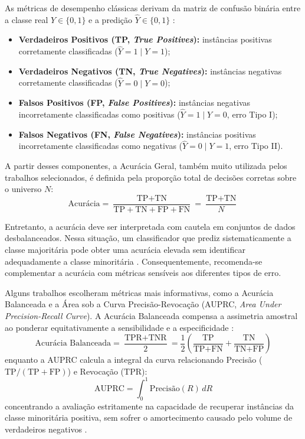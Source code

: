As métricas de desempenho clássicas derivam da matriz de confusão binária entre a classe real $Y \in \{0, 1\}$ e a predição $\hat{Y} \in \{0, 1\}$ \cite{sokolova2009systematic}:
\begin{itemize}
    \item \textbf{Verdadeiros Positivos (TP, \emph{True Positives}):} instâncias positivas corretamente classificadas ($\hat{Y} = 1 \mid Y = 1$);
    \item \textbf{Verdadeiros Negativos (TN, \emph{True Negatives}):} instâncias negativas corretamente classificadas ($\hat{Y} = 0 \mid Y = 0$);
    \item \textbf{Falsos Positivos (FP, \emph{False Positives}):} instâncias negativas incorretamente classificadas como positivas ($\hat{Y} = 1 \mid Y = 0$, erro Tipo I);
    \item \textbf{Falsos Negativos (FN, \emph{False Negatives}):} instâncias positivas incorretamente classificadas como negativas ($\hat{Y} = 0 \mid Y = 1$, erro Tipo II).
\end{itemize}
A partir desses componentes, a Acurácia Geral, também muito utilizada pelos trabalhos selecionados, é definida pela proporção total de decisões corretas sobre o universo $N$:
\begin{equation}
\text{Acurácia} = \frac{\text{TP} + \text{TN}}{\text{TP} + \text{TN} + \text{FP} + \text{FN}} = \frac{\text{TP} + \text{TN}}{N}
\end{equation}

Entretanto, a acurácia deve ser interpretada com cautela em conjuntos de dados desbalanceados. Nessa situação, um classificador que prediz sistematicamente a classe majoritária pode obter uma acurácia elevada sem identificar adequadamente a classe minoritária \cite{he2009learning}. Consequentemente, recomenda-se complementar a acurácia com métricas sensíveis aos diferentes tipos de erro.

Alguns trabalhos escolheram métricas mais informativas, como a Acurácia Balanceada e a Área sob a Curva Precisão-Revocação (AUPRC, \emph{Area Under Precision-Recall Curve}). A Acurácia Balanceada compensa a assimetria amostral ao ponderar equitativamente a sensibilidade e a especificidade \cite{brodersen2010balanced}:
\begin{equation}
\text{Acurácia Balanceada} = \frac{\text{TPR} + \text{TNR}}{2} = \frac{1}{2} \left( \frac{\text{TP}}{\text{TP} + \text{FN}} + \frac{\text{TN}}{\text{TN} + \text{FP}} \right)
\end{equation}
enquanto a AUPRC calcula a integral da curva relacionando Precisão ($\text{TP} / (\text{TP} + \text{FP})$) e Revocação ($\text{TPR}$)\cite{davis2006relationship}:
\begin{equation}
\text{AUPRC} = \int_{0}^{1} \text{Precisão}(R) \, dR
\end{equation}
concentrando a avaliação estritamente na capacidade de recuperar instâncias da classe minoritária positiva, sem sofrer o amortecimento causado pelo volume de verdadeiros negativos \cite{saito2015precision}.

